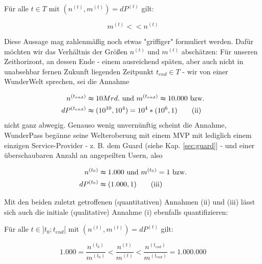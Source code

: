 \begin{Assumption}\label{assumptionRatio}
Für alle $t \in T$ mit $\left(n^{(t)}, m^{(t)}\right) = dP^{(t)}$ gilt:

\begin{equation*}
m^{(t)} << n^{(t)} \tag{i}
\end{equation*}

\vspace{0.3cm}

Diese Aussage mag zahlenmäßig noch etwas "griffiger" formuliert werden. Dafür möchten wir das Verhältnis der Größen $n^{(t)}$ und $m^{(t)}$ abschätzen: Für unseren Zeithorizont, an dessen Ende - einem ausreichend späten, aber auch nicht in unabsehbar fernen Zukunft liegenden Zeitpunkt $t_{end} \in T$ - wir von einer WunderWelt sprechen, sei die Annahme

\begin{align*}
n^{(t_{end})} &\thickapprox 10 Mrd. \textrm{ und } m^{(t_{end})} \thickapprox 10.000 \textrm{ bzw.} \\
dP^{(t_{end})} &\thickapprox (10^{10}, 10^{4}) = 10^{4} * (10^{6}, 1) \tag{ii}
\end{align*}
nicht ganz abwegig. Genauso wenig unvernünftig scheint die Annahme, WunderPass begänne seine Welteroberung mit einem MVP mit lediglich einem einzigen Service-Provider - z. B. dem Guard (siehe Kap. \ref{sec:guard}] - und einer überschaubaren Anzahl an angepeilten Usern, also

\begin{align*}
n^{(t_0)} &\thickapprox 1.000 \textrm{ und } m^{(t_0)} = 1 \textrm{ bzw.} \\
dP^{(t_0)} &\thickapprox (1.000, 1) \tag{iii}
\end{align*}

\vspace{0.3cm}

Mit den beiden zuletzt getroffenen (quantitativen) Annahmen (ii) und (iii) lässt sich auch die initiale (qualitative) Annahme (i) ebenfalls quantifizieren:

\vspace{0.3cm}

Für alle $t \in ]t_0; t_{end}[$ mit $\left(n^{(t)}, m^{(t)}\right) = dP^{(t)}$ gilt:

\begin{equation*}
1.000 = \frac{n^{(t_0)}}{m^{(t_0)}} < \frac{n^{(t)}}{m^{(t)}} < \frac{n^{(t_{end})}}{m^{(t_{end})}} = 1.000.000 \tag{iv}
\end{equation*}

\end{Assumption}

